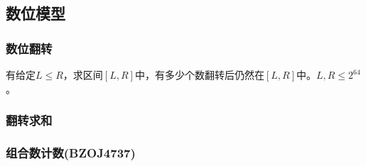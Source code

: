 \subsection{数位模型}
\subsubsection{数位翻转}
有给定$L\le R$，求区间$[L,R]$中，有多少个数翻转后仍然在$[L,R]$中。$L, R\le 2^{64}$。
\subsubsection{翻转求和}
\subsubsection{组合数计数(BZOJ4737)}
\fi

